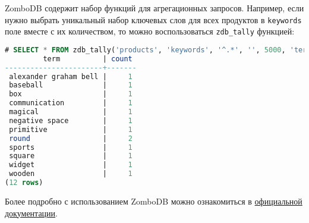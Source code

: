 ZomboDB содержит набор функций для агрегационных запросов. Например, если нужно выбрать уникальный набор ключевых слов для всех продуктов в \lstinline!keywords! поле вместе с их количеством, то можно воспользоваться \lstinline!zdb_tally! функцией:

\begin{lstlisting}[language=SQL,label=lst:zombodb8,caption=Zdb\_tally]
# SELECT * FROM zdb_tally('products', 'keywords', '^.*', '', 5000, 'term');
         term          | count
-----------------------+-------
 alexander graham bell |     1
 baseball              |     1
 box                   |     1
 communication         |     1
 magical               |     1
 negative space        |     1
 primitive             |     1
 round                 |     2
 sports                |     1
 square                |     1
 widget                |     1
 wooden                |     1
(12 rows)
\end{lstlisting}

Более подробно с использованием ZomboDB можно ознакомиться в \href{https://github.com/zombodb/zombodb#quick-links}{официальной документации}.
